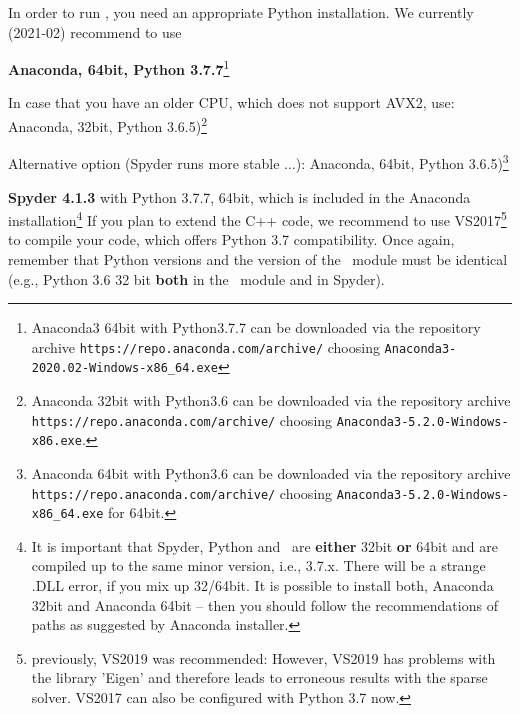 In order to run \codeName , you need an appropriate Python installation.
We currently (2021-02) recommend to use
\bi
  \item {\bf Anaconda, 64bit, Python 3.7.7}\footnote{Anaconda3 64bit with Python3.7.7 can be downloaded via the repository archive \texttt{https://repo.anaconda.com/archive/} choosing \texttt{Anaconda3-2020.02-Windows-x86\_64.exe}}
  \item In case that you have an older CPU, which does not support AVX2, use: Anaconda, 32bit, Python 3.6.5)\footnote{Anaconda 32bit with Python3.6 can be downloaded via the repository archive \texttt{https://repo.anaconda.com/archive/} choosing \texttt{Anaconda3-5.2.0-Windows-x86.exe}.}
  \item Alternative option (Spyder runs more stable ...): Anaconda, 64bit, Python 3.6.5)\footnote{Anaconda 64bit with Python3.6 can be downloaded via the repository archive \texttt{https://repo.anaconda.com/archive/} choosing \texttt{Anaconda3-5.2.0-Windows-x86\_64.exe} for 64bit.}
	\item {\bf Spyder 4.1.3} with Python 3.7.7, 64bit, which is included in the Anaconda installation\footnote{It is important that Spyder, Python and \codeName\  are {\bf either} 32bit {\bf or} 64bit and are compiled up to the same minor version, i.e., 3.7.x. 
	There will be a strange .DLL error, if you mix up 32/64bit. It is possible to install both, Anaconda 32bit and Anaconda 64bit -- then you should follow the recommendations of paths as suggested by Anaconda installer.}
\ei
If you plan to extend the C++ code, we recommend to use VS2017\footnote{previously, VS2019 was recommended: However, VS2019 has problems with the library 'Eigen' and therefore leads to erroneous results with the sparse solver. VS2017 can also be configured with Python 3.7 now.} to compile your code, which offers Python 3.7 compatibility.
Once again, remember that Python versions and the version of the \codeName\ module must be identical (e.g., Python 3.6 32 bit {\bf both} in the \codeName\ module and in Spyder).


